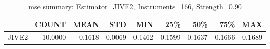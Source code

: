 \begin{table}[ht]
\centering
\caption{mse summary: Estimator=JIVE2, Instruments=166, Strength=0.90}
\begin{tabular}{lrrrrrrrr}
\toprule
 & COUNT & MEAN & STD & MIN & 25\% & 50\% & 75\% & MAX \\
\midrule
JIVE2 & 10.0000 & 0.1618 & 0.0069 & 0.1462 & 0.1599 & 0.1637 & 0.1666 & 0.1689 \\
\bottomrule
\end{tabular}
\end{table}
